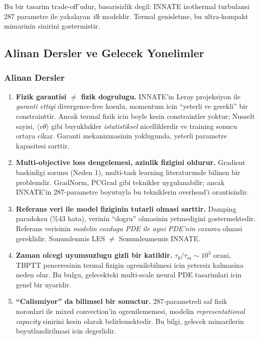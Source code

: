 Bu bir tasarim trade-off'udur, basarisizlik degil: INNATE izothermal
turbulansi 287 parametre ile yakalayan \emph{ilk} modeldir. Termal
genisletme, bu ultra-kompakt mimarinin sinirini gostermistir.


\subsection{Alinan Dersler ve Gelecek Yonelimler}
\label{sec:lessons-future}

\subsubsection{Alinan Dersler}

\begin{enumerate}
  \item \textbf{Fizik garantisi $\neq$ fizik dogrulugu.}
        INNATE'in Leray projeksiyon ile \emph{garanti ettigi} divergence-free
        kosulu, momentum icin ``yeterli ve gerekli'' bir constrainttir.
        Ancak termal fizik icin boyle kesin constraintler yoktur; Nusselt
        sayisi, $\langle v\theta \rangle$ gibi buyuklukler \emph{istatistiksel}
        nicelliklerdir ve training sonucu ortaya cikar. Garanti
        mekanizmasinin yoklugunda, yeterli parametre kapasitesi sarttir.

  \item \textbf{Multi-objective loss dengelemesi, azinlik fizigini oldurur.}
        Gradient baskinligi sorunu (Neden 1), multi-task learning
        literaturunde \cite{chen2018gradnorm, yu2020gradient} bilinen bir
        problemdir. GradNorm, PCGrad gibi teknikler uygulanabilir; ancak
        INNATE'in 287-parametre boyutuyla bu tekniklerin overhead'i
        orantisizdir.

  \item \textbf{Referans veri ile model fiziginin tutarli olmasi sarttir.}
        Damping paradoksu (\%43 hata), verinin ``dogru'' olmasinin yetmedigini
        gostermektedir. Referans verisinin \emph{modelin cozdugu PDE ile
        ayni PDE'nin cozumu} olmasi gereklidir. Sonumlenmis LES $\neq$
        Sonumlenmemis INNATE.

  \item \textbf{Zaman olcegi uyumsuzlugu gizli bir katildir.}
        $\tau_\theta / \tau_m \sim 10^3$ orani, TBPTT penceresinin
        termal fizigin ogrenilebilmesi icin yetersiz kalmasina neden olur.
        Bu bulgu, gelecekteki multi-scale neural PDE tasarimlari icin
        genel bir uyaridir.

  \item \textbf{``Calismiyor'' da bilimsel bir sonuctur.}
        287-parametreli saf fizik noronlari ile mixed convection'in
        ogrenilememesi, modelin \emph{representational capacity} sinirini
        kesin olarak belirlemektedir. Bu bilgi, gelecek mimarilerin
        boyutlandirilmasi icin degerlidir.
\end{enumerate}

